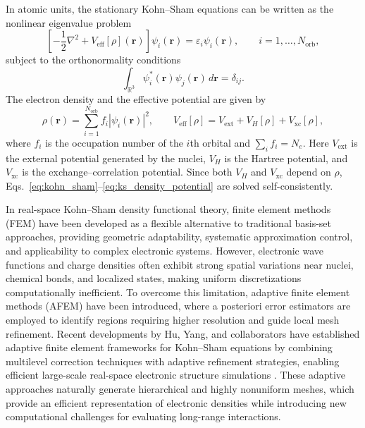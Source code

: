 \documentclass[a4paper,10pt]{article}
\begin{document}
In atomic units, the stationary Kohn--Sham equations can be written as the nonlinear eigenvalue problem
\begin{equation}
\label{eq:kohn_sham}
\left[-\frac{1}{2}\nabla^2
+V_{\mathrm{eff}}[\rho](\mathbf r)\right]
\psi_i(\mathbf r)
=\varepsilon_i\psi_i(\mathbf r),
\qquad i=1,\ldots,N_{\mathrm{orb}},
\end{equation}
subject to the orthonormality conditions
\begin{equation}
\int_{\mathbb R^3}
\psi_i^*(\mathbf r)\psi_j(\mathbf r)\,d\mathbf r
=\delta_{ij}.
\end{equation}
The electron density and the effective potential are given by
\begin{equation}
\label{eq:ks_density_potential}
\rho(\mathbf r)
=\sum_{i=1}^{N_{\mathrm{orb}}}f_i|\psi_i(\mathbf r)|^2,
\qquad
V_{\mathrm{eff}}[\rho]
=V_{\mathrm{ext}}+V_H[\rho]+V_{\mathrm{xc}}[\rho],
\end{equation}
where \(f_i\) is the occupation number of the \(i\)th orbital and
\(\sum_i f_i=N_e\). Here \(V_{\mathrm{ext}}\) is the external potential
generated by the nuclei, \(V_H\) is the Hartree potential, and
\(V_{\mathrm{xc}}\) is the exchange--correlation potential. Since both
\(V_H\) and \(V_{\mathrm{xc}}\) depend on \(\rho\),
Eqs.~\eqref{eq:kohn_sham}--\eqref{eq:ks_density_potential} are solved
self-consistently.

In real-space Kohn--Sham density functional theory, finite element methods (FEM) have been developed as a flexible alternative to traditional basis-set approaches, providing geometric adaptability, systematic approximation control, and applicability to complex electronic systems. However, electronic wave functions and charge densities often exhibit strong spatial variations near nuclei, chemical bonds, and localized states, making uniform discretizations computationally inefficient. To overcome this limitation, adaptive finite element methods (AFEM) have been introduced, where a posteriori error estimators are employed to identify regions requiring higher resolution and guide local mesh refinement. Recent developments by Hu, Yang, and collaborators have established adaptive finite element frameworks for Kohn--Sham equations by combining multilevel correction techniques with adaptive refinement strategies, enabling efficient large-scale real-space electronic structure simulations
\cite{BaoHuLiu2012,HuXieXu2018,YangShenHu2021}. These adaptive approaches naturally generate hierarchical and highly nonuniform meshes, which provide an efficient representation of electronic densities while introducing new computational challenges for evaluating long-range interactions.
\end{document}
